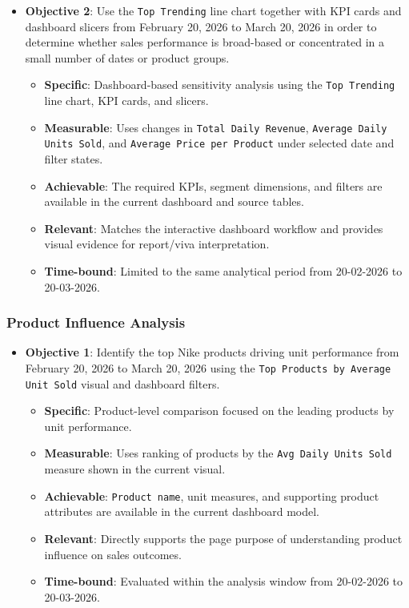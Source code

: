     \begin{itemize}
        \item \textbf{Objective 2}: Use the \texttt{Top Trending} line chart together with KPI cards and dashboard slicers from February 20, 2026 to March 20, 2026 in order to determine whether sales performance is broad-based or concentrated in a small number of dates or product groups.
        \begin{itemize}
            \item \textbf{Specific}: Dashboard-based sensitivity analysis using the \texttt{Top Trending} line chart, KPI cards, and slicers.
            \item \textbf{Measurable}: Uses changes in \texttt{Total Daily Revenue}, \texttt{Average Daily Units Sold}, and \texttt{Average Price per Product} under selected date and filter states.
            \item \textbf{Achievable}: The required KPIs, segment dimensions, and filters are available in the current dashboard and source tables.
            \item \textbf{Relevant}: Matches the interactive dashboard workflow and provides visual evidence for report/viva interpretation.
            \item \textbf{Time-bound}: Limited to the same analytical period from 20-02-2026 to 20-03-2026.
        \end{itemize}
    \end{itemize}

    \subsubsection{Product Influence Analysis}
    \begin{itemize}
        \item \textbf{Objective 1}: Identify the top Nike products driving unit performance from February 20, 2026 to March 20, 2026 using the \texttt{Top Products by Average Unit Sold} visual and dashboard filters.
        \begin{itemize}
            \item \textbf{Specific}: Product-level comparison focused on the leading products by unit performance.
            \item \textbf{Measurable}: Uses ranking of products by the \texttt{Avg Daily Units Sold} measure shown in the current visual.
            \item \textbf{Achievable}: \texttt{Product name}, unit measures, and supporting product attributes are available in the current dashboard model.
            \item \textbf{Relevant}: Directly supports the page purpose of understanding product influence on sales outcomes.
            \item \textbf{Time-bound}: Evaluated within the analysis window from 20-02-2026 to 20-03-2026.
        \end{itemize}
    \end{itemize}

